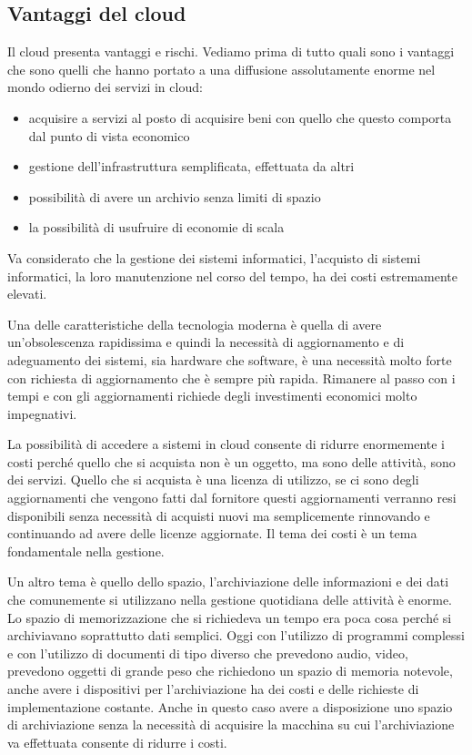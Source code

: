 \subsection{Vantaggi del cloud}
Il cloud presenta vantaggi e rischi. 
Vediamo prima di tutto quali sono i vantaggi che sono quelli che hanno portato a una diffusione assolutamente enorme nel mondo odierno dei servizi in cloud: 

\begin{itemize}
    \item acquisire a servizi al posto di acquisire beni con quello che questo comporta dal punto di vista economico
    \item gestione dell'infrastruttura semplificata, effettuata da altri
    \item possibilità di avere un archivio senza limiti di spazio
    \item la possibilità di usufruire di economie di scala
\end{itemize}

Va considerato che la gestione dei sistemi informatici, l'acquisto di sistemi informatici, la loro manutenzione nel corso del tempo, ha dei costi estremamente elevati. 

Una delle caratteristiche della tecnologia moderna è quella di avere un'obsolescenza rapidissima e quindi la necessità di aggiornamento e di adeguamento dei sistemi, sia hardware che software, è una necessità molto forte con richiesta di aggiornamento che è sempre più rapida. Rimanere al passo con i tempi e con gli aggiornamenti richiede degli investimenti economici molto impegnativi. 

La possibilità di accedere a sistemi in cloud consente di ridurre enormemente i costi perché quello che si acquista non è un oggetto, ma sono delle attività, sono dei servizi. 
Quello che si acquista è una licenza di utilizzo, se ci sono degli aggiornamenti che vengono fatti dal fornitore questi aggiornamenti verranno resi disponibili senza necessità di acquisti nuovi ma semplicemente rinnovando e continuando ad avere delle licenze aggiornate. 
Il tema dei costi è un tema fondamentale nella gestione. 

Un altro tema è quello dello spazio, l'archiviazione delle informazioni e dei dati che comunemente si utilizzano nella gestione quotidiana delle attività è enorme. Lo spazio di memorizzazione che si richiedeva un tempo era poca cosa perché si archiviavano soprattutto dati semplici. Oggi con l'utilizzo di programmi complessi e con l'utilizzo di documenti di tipo diverso che prevedono audio, video, prevedono oggetti di grande peso che richiedono un spazio di memoria notevole, anche avere i dispositivi per l'archiviazione ha dei costi e delle richieste di implementazione costante. Anche in questo caso avere a disposizione uno spazio di archiviazione senza la necessità di acquisire la macchina su cui l'archiviazione va effettuata consente di ridurre i costi. 

